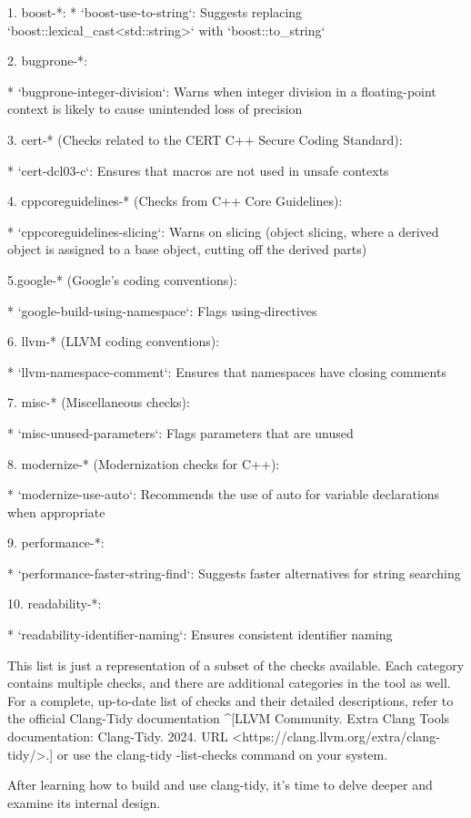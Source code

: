 \begin{markdown}
1. boost-*:
* `boost-use-to-string`: Suggests replacing `boost::lexical_cast<std::string>` with `boost::to_string`

2. bugprone-*:

* `bugprone-integer-division`: Warns when integer division in a floating-point context is likely to cause unintended loss of precision

3. cert-* (Checks related to the CERT C++ Secure Coding Standard):

* `cert-dcl03-c`: Ensures that macros are not used in unsafe contexts

4. cppcoreguidelines-* (Checks from C++ Core Guidelines):

* `cppcoreguidelines-slicing`: Warns on slicing (object slicing, where a derived object is assigned to a base object, cutting off the derived parts)

5.google-* (Google's coding conventions):

* `google-build-using-namespace`: Flags using-directives

6. llvm-* (LLVM coding conventions):

* `llvm-namespace-comment`: Ensures that namespaces have closing comments

7. misc-* (Miscellaneous checks):

* `misc-unused-parameters`: Flags parameters that are unused

8. modernize-* (Modernization checks for C++):

* `modernize-use-auto`: Recommends the use of auto for variable declarations when appropriate

9. performance-*:

* `performance-faster-string-find`: Suggests faster alternatives for string searching

10. readability-*:

* `readability-identifier-naming`: Ensures consistent identifier naming

This list is just a representation of a subset of the checks available. Each category contains multiple checks, and there are additional categories in the tool as well. For a complete, up-to-date list of checks and their detailed descriptions, refer to the official Clang-Tidy documentation ^[LLVM Community. Extra Clang Tools documentation: Clang-Tidy. 2024. URL <https://clang.llvm.org/extra/clang-tidy/>.] or use the clang-tidy -list-checks command on your system.

After learning how to build and use clang-tidy, it's time to delve deeper and examine its internal design.

\end{markdown}





















